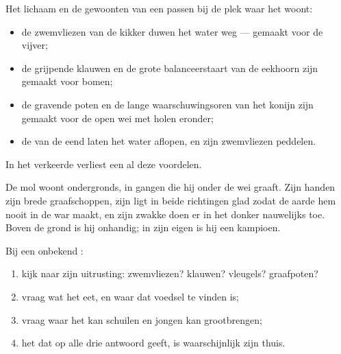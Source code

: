 \begin{proposition}\label{prop:g2:where-animals-live:fit}
Het lichaam en de gewoonten van een  passen bij de plek waar het
woont:
\begin{itemize}
  \item de zwemvliezen van de kikker duwen het water weg --- gemaakt
        voor de vijver;
  \item de grijpende klauwen en de grote balanceerstaart van de
        eekhoorn zijn gemaakt voor bomen;
  \item de gravende poten en de lange waarschuwingsoren van het konijn
        zijn gemaakt voor de open wei met holen eronder;
  \item de  van de eend laten het water aflopen, en zijn
        zwemvliezen peddelen.
\end{itemize}
In het verkeerde  verliest een  al deze voordelen.
\end{proposition}
\admitted

\begin{example}\label{ex:g2:where-animals-live:mole}
De mol woont ondergronds, in gangen die hij onder de wei graaft. Zijn
handen zijn brede graafschoppen, zijn  ligt in beide richtingen
glad zodat de aarde hem nooit in de war maakt, en zijn zwakke  doen
er in het donker nauwelijks toe. Boven de grond is hij onhandig; in
zijn eigen  is hij een kampioen.
\end{example}

\begin{method}\label{met:g2:where-animals-live:matching}
Bij een onbekend :
\begin{enumerate}
  \item kijk naar zijn uitrusting: zwemvliezen? klauwen? vleugels?
        graafpoten?
  \item vraag wat het eet, en waar dat voedsel te vinden is;
  \item vraag waar het kan schuilen en jongen kan grootbrengen;
  \item het  dat op alle drie antwoord geeft, is
        waarschijnlijk zijn thuis.
\end{enumerate}
\end{method}

